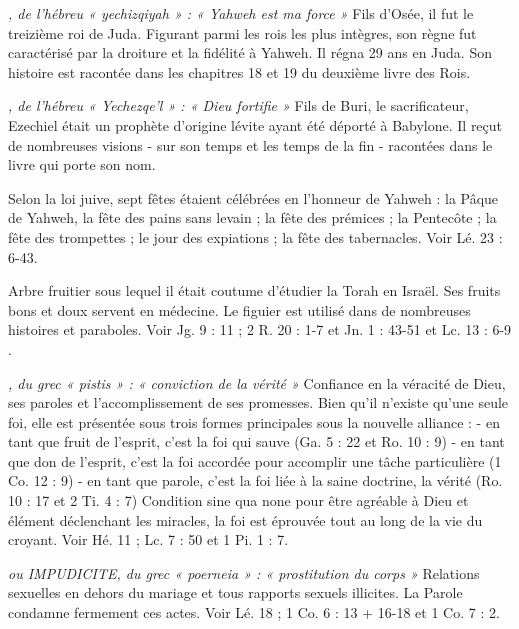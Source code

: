 \begin{multicols}{2}
\textit{, de l'hébreu « yechizqiyah » : « Yahweh est ma force »}\newline
Fils d'Osée, il fut le treizième roi de Juda. Figurant parmi les rois les plus intègres, son règne fut caractérisé par la droiture et la fidélité à Yahweh. Il régna 29 ans en Juda. Son histoire est racontée dans les chapitres 18 et 19 du deuxième livre des Rois.

\textit{, de l'hébreu « Yechezqe'l » : « Dieu fortifie »}\newline
Fils de Buri, le sacrificateur, Ezechiel était un prophète d’origine lévite ayant été déporté à Babylone. Il reçut de nombreuses visions - sur son temps et les temps de la fin - racontées dans le livre qui porte son nom.

\textit{}\newline
Selon la loi juive, sept fêtes étaient célébrées en l’honneur de Yahweh : la Pâque de Yahweh, la fête des pains sans levain ; la fête des prémices ; la Pentecôte ; la fête des trompettes ; le jour des expiations ; la fête des tabernacles. Voir Lé. 23 : 6-43.

\textit{}\newline
Arbre fruitier sous lequel il était coutume d’étudier la Torah en Israël. Ses fruits bons et doux servent en médecine. Le figuier est utilisé dans de nombreuses histoires et paraboles. Voir Jg. 9 : 11 ; 2 R. 20 : 1-7 et Jn. 1 : 43-51 et Lc. 13 : 6-9 .

\textit{, du grec « pistis » : « conviction de la vérité »}\newline
Confiance en la véracité de Dieu, ses paroles et l’accomplissement de ses promesses. Bien qu’il n’existe qu’une seule foi, elle est présentée sous trois formes principales sous la nouvelle alliance :
- en tant que fruit de l’esprit, c’est la foi qui sauve (Ga. 5 : 22 et Ro. 10 : 9)
- en tant que don de l’esprit, c’est la foi accordée pour accomplir une tâche particulière (1 Co. 12 : 9)
- en tant que parole, c’est la foi liée à la saine doctrine, la vérité (Ro. 10 : 17 et 2 Ti. 4 : 7)
Condition sine qua none pour être agréable à Dieu et élément déclenchant les miracles, la foi est éprouvée tout au long de la vie du croyant. Voir Hé. 11 ; Lc. 7 : 50 et 1 Pi. 1 : 7.

\textit{ou IMPUDICITE, du grec « poerneia » : « prostitution du corps »}\newline
Relations sexuelles en dehors du mariage et tous rapports sexuels illicites. La Parole condamne fermement ces actes. Voir Lé. 18 ; 1 Co. 6 : 13 + 16-18 et 1 Co. 7 : 2.


\end{multicols}
